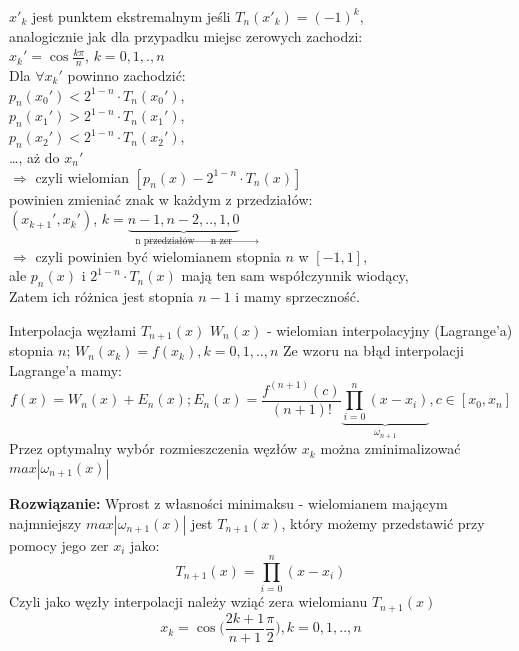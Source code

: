 \begin{frame}
		$x'_k$ jest punktem ekstremalnym jeśli $T_n(x'_k)=(-1)^k$,\\
		analogicznie jak dla przypadku miejsc zerowych zachodzi:\\ $x_k'=\cos\frac{k\pi}{n}$, $k=0,1,.,n$\\
        Dla $\forall x_k'$ powinno zachodzić: \\
        $p_n(x_0') < 2^{1-n} \cdot T_n(x_0')$, \\
        $p_n(x_1') > 2^{1-n} \cdot T_n(x_1')$, \\
        $p_n(x_2') < 2^{1-n} \cdot T_n(x_2')$, \\
        \ldots , aż do $x_n'$ \\
        $\Rightarrow$ czyli wielomian $[p_n(x) - 2^{1-n} \cdot T_n(x)]$ \\
        powinien zmieniać znak w każdym z przedziałów: \\
        $(x_{k+1}',x_k')$, $k = \underbrace{n-1, n-2,..,1,0}_{\text{n przedziałów $\rightarrow$ n zer}} $\\ 
         $\Rightarrow $ czyli powinien być wielomianem stopnia $n$ w $[-1,1]$, \\ 
         ale $p_n(x)$ i $2^{1-n} \cdot T_n(x)$ mają ten sam współczynnik wiodący, \\
         Zatem ich różnica jest stopnia $n-1$ i mamy sprzeczność.
	
\end{frame}
\begin{frame}{Interpolacja  węzłami $T_{n+1}(x)$}
	$W_n(x)$ - wielomian interpolacyjny (Lagrange'a) stopnia $n$; $W_n(x_k) = f(x_k),k=0,1,..,n$
	Ze wzoru na błąd interpolacji Lagrange'a mamy:
    $$f(x) = W_n(x)+E_n(x); E_n(x) = \frac{f^{(n+1)}(c)}{(n+1)!}\underbrace{\prod_{i=0}^{n}(x-x_i)}_{\omega_{n+1}}
	, c \in [x_0,x_n]$$
    Przez optymalny wybór rozmieszczenia węzłów $x_k$ można zminimalizować $max|\omega_{n+1}(x)|$\newline
    \end{frame}
    \begin{frame}
   \textbf{Rozwiązanie:} Wprost z własności minimaksu - wielomianem mającym najmniejszy $max|\omega_{n+1}(x)|$ jest $T_{n+1}(x)$, który możemy przedstawić przy pomocy jego zer $x_i$ jako:
   $$T_{n+1}(x)=\prod_{i=0}^{n}(x-x_i)$$
    Czyli jako węzły interpolacji należy wziąć zera wielomianu $T_{n+1}(x)$
    $$x_k = \cos \Big(\frac{2k+1}{n+1}\frac{\pi}{2}\Big), k=0,1,..,n $$
    
\end{frame}
